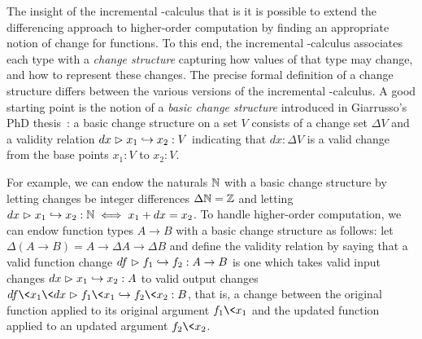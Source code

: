 The insight of the incremental \fn-calculus that is it is possible to extend the differencing approach to higher-order computation by finding an appropriate notion of change for functions.
%
To this end, the incremental \fn-calculus associates each type with a \emph{change structure} capturing how values of that type may change, and how to represent these changes.
%
The precise formal definition of a change structure differs between the various versions of the incremental \fn-calculus.
%
A good starting point is the notion of a \emph{basic change structure} introduced in Giarrusso's PhD thesis~\citeyearpar[chapter 12, definition 12.1.1]{DBLP:phd/dnb/Giarrusso20}:
%
a basic change structure on a set $V$ consists of a change set $\Delta V$ and a validity relation $\gvalid{V}{dx}{x_1}{x_2}$ indicating that $dx : \Delta V$ is a valid change from the base points $x_1 : V$ to $x_2 : V$.

For example, we can endow the naturals $\N$ with a basic change structure by
letting changes be integer differences $\Delta \N = \mathbb{Z}$ and letting
$\gvalid{\N}{dx}{x_1}{x_2} \iff x_1 + dx = x_2$.
%
To handle higher-order computation, we can endow function types $A \to B$ with a
basic change structure as follows: let $\Delta(A \to B) = A \to \Delta A \to
\Delta B$ and define the validity relation by saying that a valid function
change $\gvalid{A \to B}{df}{f_1}{f_2}$ is one which takes valid input changes
$\gvalid{A}{dx}{x_1}{x_2}$ to valid output changes
$\gvalid{B}{df\<x_1\<dx}{f_1\<x_1}{f_2\<x_2}$, that is, a change between the
original function applied to its original argument $f_1\<x_1$ and the updated
function applied to an updated argument $f_2\<x_2$.




